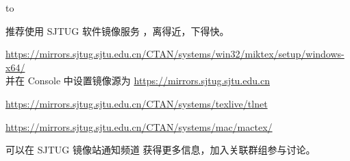 \begin{frame}[plain]
  \hbox to 

  \begin{center}
    \parbox{0.8\textwidth}{
      推荐使用 SJTUG 软件镜像服务 ，离得近，下得快。

      \begin{description}
        \footnotesize
        \item[\hologo{MiKTeX}] \url{https://mirrors.sjtug.sjtu.edu.cn/CTAN/systems/win32/miktex/setup/windows-x64/} \\ 并在  Console 中设置镜像源为 \url{https://mirrors.sjtug.sjtu.edu.cn}
        \item[\TeX{} Live] \url{https://mirrors.sjtug.sjtu.edu.cn/CTAN/systems/texlive/tlnet}
        \item[Mac\TeX{}] \url{https://mirrors.sjtug.sjtu.edu.cn/CTAN/systems/mac/mactex/}
        \item[\faTelegram] 可以在 SJTUG 镜像站通知频道  获得更多信息，加入关联群组参与讨论。
      \end{description}
    }
  \end{center}
\end{frame}

